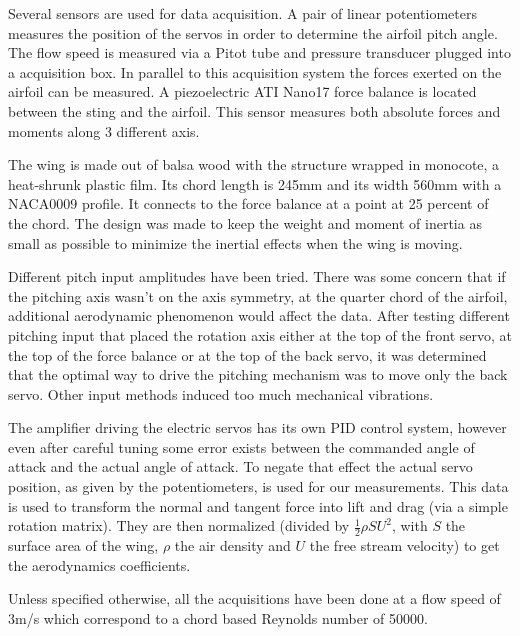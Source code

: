 \par Several sensors are used for data acquisition.
A pair of linear potentiometers measures the position of the servos in order to determine the airfoil pitch angle.
The flow speed is measured via a Pitot tube and pressure transducer plugged into a acquisition box.
In parallel to this acquisition system the forces exerted on the airfoil can be measured.
A piezoelectric ATI Nano17 force balance is located between the sting and the airfoil.
This sensor measures both absolute forces and moments along 3 different axis.

\par The wing is made out of balsa wood with the structure wrapped in monocote, a heat-shrunk plastic film.
Its chord length is 245mm and its width 560mm with a NACA0009 profile.
It connects to the force balance at a point at 25 percent of the chord.
The design was made to keep the weight and moment of inertia as small as possible to minimize the inertial effects when the wing is moving.


\FloatBarrier

Different pitch input amplitudes have been tried.
There was some concern that if the pitching axis wasn't on the axis symmetry, at the quarter chord of the airfoil, additional aerodynamic phenomenon would affect the data.
After testing different pitching input that placed the rotation axis either at the top of the front servo, at the top of the force balance or at the top of the back servo,  it was determined that the optimal way to drive the pitching mechanism was to move only the back servo.
Other input methods induced too much mechanical vibrations.

\par The amplifier driving the electric servos has its own PID control system, however even after careful tuning some error exists between the commanded angle of attack and the actual angle of attack.
To negate that effect the actual servo position, as given by the potentiometers, is used for our measurements.
This data is used to transform the normal and tangent force into lift and drag (via a simple rotation matrix). 
They are then normalized (divided by $\frac{1}{2}\rho S U^2$, with $S$ the surface area of the wing, $\rho$ the air density and $U$ the free stream velocity) to get the aerodynamics coefficients.

\par Unless specified otherwise, all the acquisitions have been done at a flow speed of 3m/s which correspond to a chord based Reynolds number of 50000.


